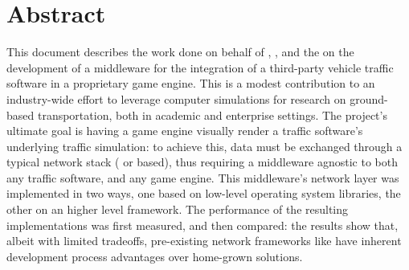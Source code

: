 \chapter*{Abstract}\label{ch:abstract}
\TOCsection{}

This document describes the work done on behalf of , , and the  on the development of a middleware for the integration of a third-party vehicle traffic software in a proprietary game engine. This is a modest contribution to an industry-wide effort to leverage computer simulations for research on ground-based transportation, both in academic and enterprise settings. The project's ultimate goal is having a game engine visually render a traffic software's underlying traffic simulation: to achieve this, data must be exchanged through a typical network stack ( or  based), thus requiring a middleware agnostic to both any traffic software, and any game engine. This middleware's network layer was implemented in two ways, one based on low-level operating system libraries, the other on an higher level framework. The performance of the resulting implementations was first measured, and then compared: the results show that, albeit with limited tradeoffs, pre-existing network frameworks like  have inherent development process advantages over home-grown solutions.
